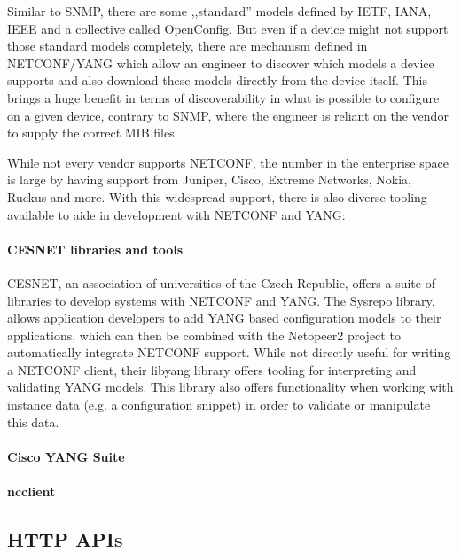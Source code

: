 Similar to SNMP, there are some ,,standard'' models defined by \acrshort{IETF}, IANA, IEEE
and a collective called OpenConfig. But even if a device might not support those standard
models completely, there are mechanism defined in NETCONF/YANG which allow an engineer
to discover which models a device supports and also download these models directly from the
device itself. This brings a huge benefit in terms of discoverability in what is possible
to configure on a given device, contrary to SNMP, where the engineer is reliant on
the vendor to supply the correct MIB files.

While not every vendor supports NETCONF, the number in the enterprise space is large by
having support from Juniper, Cisco, Extreme Networks, Nokia, Ruckus and more.
With this widespread support, there is also diverse tooling available to aide in development
with NETCONF and YANG:

\paragraph{CESNET libraries and tools} CESNET, an association of universities of the Czech Republic,
offers a suite of libraries to develop systems with NETCONF and YANG.
The Sysrepo library, allows application developers to add YANG based configuration models to their
applications, which can then be combined with the Netopeer2 project to automatically integrate NETCONF
support. While not directly useful for writing a NETCONF client, their libyang library offers
tooling for interpreting and validating YANG models. This library also offers functionality when
working with instance data (e.g. a configuration snippet) in order to validate or manipulate this data.

\paragraph{Cisco YANG Suite} 

\paragraph{ncclient} 


\subsection{HTTP APIs}

